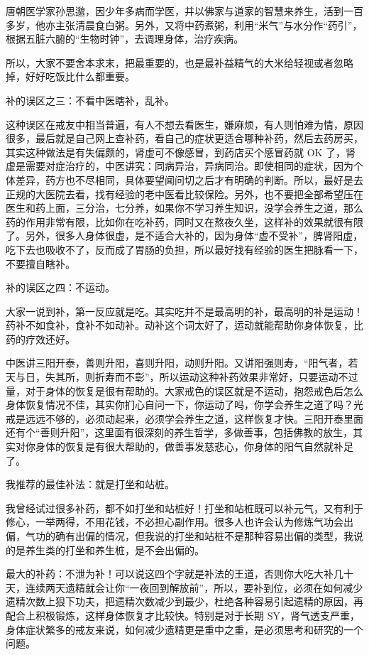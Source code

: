 \documentclass{ctexart}
\begin{document}
唐朝医学家孙思邈，因少年多病而学医，并以佛家与道家的智慧来养生，活到一百多岁，他亦主张清晨食白粥。另外，又将中药煮粥，利用“米气”与水分作“药引”，根据五脏六腑的“生物时钟”，去调理身体，治疗疾病。

所以，大家不要舍本求末，把最重要的，也是最补益精气的大米给轻视或者忽略掉，好好吃饭比什么都重要。

补的误区之三：不看中医瞎补，乱补。

这种误区在戒友中相当普遍，有人不想去看医生，嫌麻烦，有人则怕难为情，原因很多，最后就是自己网上查补药，看自己的症状更适合哪种补药，然后去药房买，其实这种做法是有失偏颇的，肾虚可不像感冒，到药店买个感冒药就 OK 了，肾虚是需要对症治疗的，中医讲究：同病异治，异病同治。即使相同的症状，因为个体差异，药方也不尽相同，具体要望闻问切之后才有明确的判断。所以，最好是去正规的大医院去看，找有经验的老中医看比较保险。另外，也不要把全部希望压在医生和药上面，三分治，七分养，如果你不学习养生知识，没学会养生之道，那么药的作用非常有限，比如你在吃补药，同时又在熬夜久坐，这样补的效果就很有限了。另外，很多人身体很虚，是不适合大补的，因为身体“虚不受补”，脾肾阳虚，吃下去也吸收不了，反而成了胃肠的负担，所以最好找有经验的医生把脉看一下，不要擅自瞎补。

补的误区之四：不运动。

大家一说到补，第一反应就是吃。其实吃并不是最高明的补，最高明的补是运动！药补不如食补，食补不如动补。动补这个词太好了，运动就能帮助你身体恢复，比药的疗效还好。

中医讲三阳开泰，善则升阳，喜则升阳，动则升阳。又讲阳强则寿，“阳气者，若天与日，失其所，则折寿而不彰”，所以运动这种补药效果非常好，只要运动不过量，对于身体的恢复是很有帮助的。大家戒色的误区就是不运动，抱怨戒色后怎么身体恢复情况不佳，其实你扪心自问一下，你运动了吗，你学会养生之道了吗？光戒是远远不够的，必须动起来，必须学会养生之道，这样恢复才快。三阳开泰里面还有个“善则升阳”，这里面有很深刻的养生哲学，多做善事，包括佛教的放生，其实对你身体的恢复是有很大帮助的，做善事发慈悲心，你身体的阳气自然就补足了。

我推荐的最佳补法：就是打坐和站桩。

我曾经试过很多补药，都不如打坐和站桩好！打坐和站桩既可以补元气，又有利于修心，一举两得，不用花钱，不必担心副作用。很多人也许会认为修炼气功会出偏，气功的确有出偏的情况，但我说的打坐和站桩不是那种容易出偏的类型，我说的是养生类的打坐和养生桩，是不会出偏的。

最大的补药：不泄为补！可以说这四个字就是补法的王道，否则你大吃大补几十天，连续两天遗精就会让你“一夜回到解放前”，所以，要补到位，必须在如何减少遗精次数上狠下功夫，把遗精次数减少到最少，杜绝各种容易引起遗精的原因，再配合上积极锻炼，这样身体恢复才比较快。特别是对于长期 SY，肾气透支严重，身体症状繁多的戒友来说，如何减少遗精更是重中之重，是必须思考和研究的一个问题。
\end{document}
